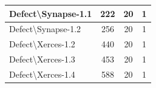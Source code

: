 \documentclass[]{svjour3}
\begin{document}
\begin{table}[]
\begin{tabular}{|l|c|c|c|}
Defect\textbackslash{}Synapse-1.1   & 222                                & 20                                                  & 1                                                  \\ \hline
Defect\textbackslash{}Synapse-1.2   & 256                                & 20                                                  & 1                                                  \\ \hline
Defect\textbackslash{}Xerces-1.2    & 440                                & 20                                                  & 1                                                  \\ \hline
Defect\textbackslash{}Xerces-1.3    & 453                                & 20                                                  & 1                                                  \\ \hline
Defect\textbackslash{}Xerces-1.4    & 588                                & 20                                                  & 1                                                  \\ \hline
\end{tabular}
\end{table}
\end{document}
